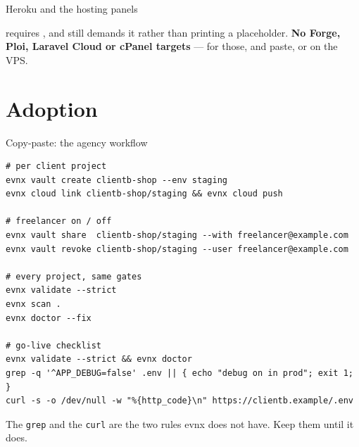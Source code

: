 \documentclass[aspectratio=169,10pt]{beamer}
\begin{document}
\begin{frame}[fragile]{Heroku and the hosting panels}

  \vspace{0.3em}
  {\footnotesize {} requires ,
  and  still demands it rather than printing a placeholder.
  \textbf{No Forge, Ploi, Laravel Cloud or cPanel targets} --- for those,
   and paste, or  on the VPS.}
\end{frame}

\section{Adoption}

\begin{frame}[fragile]{Copy-paste: the agency workflow}
\begin{lstlisting}[style=evnxcode]
# per client project
evnx vault create clientb-shop --env staging
evnx cloud link clientb-shop/staging && evnx cloud push

# freelancer on / off
evnx vault share  clientb-shop/staging --with freelancer@example.com
evnx vault revoke clientb-shop/staging --user freelancer@example.com

# every project, same gates
evnx validate --strict
evnx scan .
evnx doctor --fix

# go-live checklist
evnx validate --strict && evnx doctor
grep -q '^APP_DEBUG=false' .env || { echo "debug on in prod"; exit 1; }
curl -s -o /dev/null -w "%{http_code}\n" https://clientb.example/.env
\end{lstlisting}
  {\footnotesize The \texttt{grep} and the \texttt{curl} are the two rules evnx
  does not have. Keep them until it does.}
\end{frame}
\end{document}

